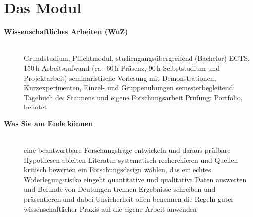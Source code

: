 \section{Das Modul}
\begin{description}
\item[{\rot\bf Wissenschaftliches Arbeiten (WuZ)}]~\\[-\lblskip]
\bi
  \ite Grundstudium, Pflichtmodul, studiengangsübergreifend (Bachelor)
   ECTS, 150\,h Arbeitsaufwand (ca.\ 60\,h Präsenz, 90\,h
    Selbststudium und Projektarbeit)
  \ite seminaristische Vorlesung mit Demonstrationen, Kurzexperimenten,
    Einzel- und Gruppenübungen
  \ite semesterbegleitend: Tagebuch des Staunens und
    eigene Forschungsarbeit
  \ite Prüfung: Portfolio, benotet
\ei
\os{\newpage}

\item[{\rot\bf Was Sie am Ende können}]~\\[-\lblskip]
\bi
  \ite eine beantwortbare Forschungsfrage entwickeln und daraus prüfbare
    Hypothesen ableiten
  \ite Literatur systematisch recherchieren und Quellen kritisch bewerten
  \ite ein Forschungsdesign wählen, das ein echtes Widerlegungsrisiko eingeht
  \ite quantitative und qualitative Daten auswerten und Befunde von
    Deutungen trennen
  \ite Ergebnisse schreiben und präsentieren und dabei Unsicherheit offen
    benennen
  \ite die Regeln guter wissenschaftlicher Praxis auf die eigene Arbeit
    anwenden
\ei
\os{\newpage}
\end{description}


